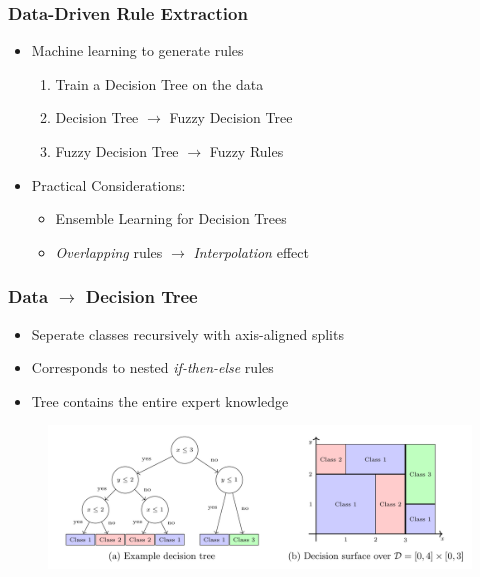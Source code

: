 \documentclass[
	10pt,
	t		%
]{beamer}
\begin{document}
\begin{frame}
	\frametitle{Data-Driven Rule Extraction}
	\begin{itemize}

		\item Machine learning to generate rules {\scriptsize  \cite{CROCKETT20062809}}
		      \begin{enumerate}
			      \item Train a Decision Tree on the data
			      \item Decision Tree $\rightarrow$ Fuzzy Decision Tree
			      \item Fuzzy Decision Tree $\rightarrow$ Fuzzy Rules
		      \end{enumerate}
		      
		      \pause
		\item Practical Considerations:
		      \begin{itemize}
			      \item Ensemble Learning for Decision Trees
			      \item \textit{Overlapping} rules $\rightarrow$ \textit{Interpolation} effect
		      \end{itemize}
	\end{itemize}
\end{frame}

\begin{frame}
	\frametitle{Data $\rightarrow$ Decision Tree}
	
	\begin{itemize}
		\item Seperate classes recursively with axis-aligned splits
		\item Corresponds to nested \textit{if-then-else} rules
		\item Tree contains the entire expert knowledge
	\end{itemize}
	
	\vspace{0.2cm}
	
	\begin{figure}
		\centering
		\includegraphics[width=1\textwidth]{figures/decision-tree.png}
	\end{figure}
	
\end{frame}
\end{document}

